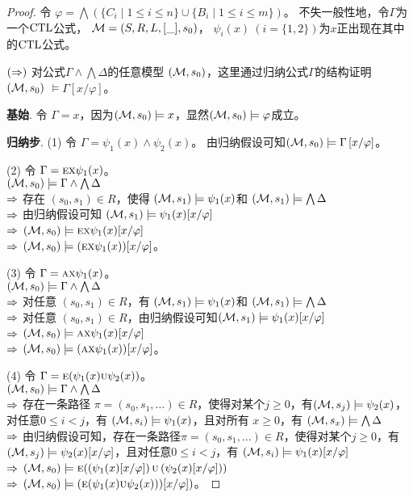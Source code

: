 \begin{proof}
	令 $\varphi = \bigwedge\left(\{C_i\mid 1\le i\le n\}\cup\{B_i\mid 1\le i\le m\}\right)$。
	不失一般性地，令$\Gamma$为一个$\textrm{CTL}$公式， ${\cal M}=(S,R,L,[\_],s_0)$， $\psi_i(x)~(i=\{1,2\})$为$x$正出现在其中的$\textrm{CTL}$公式。
	
	$(\Rightarrow)$ 对公式$\Gamma \wedge \bigwedge \Delta$的任意模型 $({\cal M}, s_0)$，这里通过归纳公式$\Gamma$的结构证明 $({\cal M}, s_0)$ $\models\Gamma\left[x/\varphi \right]$。
	
	\textbf{基始}. 令 $\Gamma = x$，因为$({\cal M}, s_0)\models x$，显然$({\cal M}, s_0)\models \varphi$成立。
	
	\textbf{归纳步}. (1) 令 $\Gamma= \psi_1(x) \wedge \psi_2(x)$。
	由归纳假设可知$({\cal M}, s_0)\models \Gamma\left[x/\varphi \right]$。
	
	(2) 令 $\Gamma = \textsc{e}\textsc{x} \psi_1(x)$。 \\
	$({\cal M},s_0)\models \Gamma \wedge \bigwedge \Delta$\\
	$\Rightarrow$ 存在 $(s_0, s_1)\in R$，使得 $({\cal M},s_1) \models \psi_1(x)$和 $({\cal M},s_1) \models \bigwedge \Delta$\\
	$\Rightarrow$ 由归纳假设可知 $({\cal M},s_1) \models \psi_1(x)[x/\varphi]$\\
	$\Rightarrow$ $({\cal M},s_0)\models \textsc{e}\textsc{x} \psi_1(x)[x/\varphi]$\\
	$\Rightarrow$ $({\cal M},s_0)\models (\textsc{e}\textsc{x} \psi_1(x))[x/\varphi]$。
	
	(3) 令 $\Gamma = \textsc{a}\textsc{x} \psi_1(x)$。 \\
	$({\cal M},s_0)\models \Gamma \wedge \bigwedge \Delta$\\
	$\Rightarrow$ 对任意 $(s_0, s_1)\in R$，有 $({\cal M},s_1) \models \psi_1(x)$和 $({\cal M},s_1) \models \bigwedge \Delta$\\
	$\Rightarrow$  对任意 $(s_0, s_1)\in R$，由归纳假设可知$({\cal M},s_1) \models \psi_1(x)[x/\varphi]$\\
	$\Rightarrow$ $({\cal M},s_0)\models \textsc{a}\textsc{x} \psi_1(x)[x/\varphi]$\\
	$\Rightarrow$ $({\cal M},s_0)\models (\textsc{a}\textsc{x} \psi_1(x))[x/\varphi]$。
	
	(4) 令 $\Gamma = \textsc{e}(\psi_1(x) \textsc{u} \psi_2(x))$。 \\
	$({\cal M},s_0)\models \Gamma \wedge \bigwedge \Delta$\\
	$\Rightarrow$ 存在一条路径 $\pi=(s_0, s_1, \dots)\in R$，使得对某个$j \geq 0$，有$({\cal M},s_j) \models \psi_2(x)$，对任意$0\leq i < j$，有 $({\cal M},s_i) \models \psi_1(x)$，且对所有 $x \geq 0$，有 $({\cal M},s_x) \models \bigwedge \Delta$\\
	$\Rightarrow$ 由归纳假设可知，存在一条路径$\pi=(s_0, s_1, \dots)\in R$，使得对某个$j \geq 0$，有$({\cal M},s_j) \models \psi_2(x)[x/\varphi]$，且对任意$0\leq i < j$，有 $({\cal M},s_i) \models \psi_1(x)[x/\varphi]$\\
	$\Rightarrow$ $({\cal M},s_0)\models \textsc{e}(\left(\psi_1(x)[x/\varphi]\right) \textsc{u} \left(\psi_2(x)[x/\varphi]\right))$\\
	$\Rightarrow$ $({\cal M},s_0)\models \left(\textsc{e}(\psi_1(x) \textsc{u} \psi_2(x)))[x/\varphi]\right)$。
	

\end{proof}
